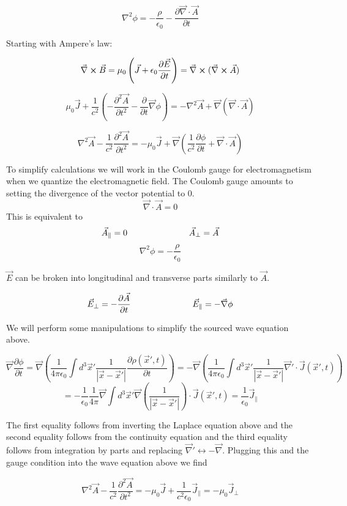 \documentclass[12pt]{article}
\newcommand{\pll}{\parallel}
\newcommand{\pardiv}[2][]{\frac{\partial #1}{\partial #2}}
\newcommand{\vecnab}{\vec{\nabla}}
\begin{document}
\[ \nabla^2 \phi = -\frac{\rho}{\epsilon_0} - \pardiv[\vecnab \cdot \vec{A}]{t} \]

Starting with Ampere's law:

\[ \vecnab \cross \vec{B} = \mu_0 \left(\vec{J} +\epsilon_0 \pardiv[\vec{E}]{t} \right) = \vecnab \cross(\vecnab \cross \vec{A})\]

\[\mu_0 \vec{J} +\frac{1}{c^2}\left(-\pardiv[^2\vec{A}]{t^2} - \pardiv{t} \vecnab \phi \right) = -\nabla^2 \vec{A} +\vecnab(\vecnab\cdot \vec{A})\]

\[ \nabla^2 \vec{A} -\frac{1}{c^2} \pardiv[^2 \vec{A}]{t^2} = -\mu_0 \vec{J} + \vecnab\left(\frac{1}{c^2}\pardiv[\phi]{t}+\vecnab\cdot\vec{A}\right) \]

To simplify calculations we will work in the Coulomb gauge for electromagnetism when we quantize the electromagnetic field.
The Coulomb gauge amounts to setting the divergence of the vector potential to 0.
\[\vecnab \cdot \vec{A} = 0\]
This is equivalent to 
\[ \vec{A}_{\pll} = 0 \hspace{1 in} \vec{A}_{\perp} = \vec{A} \]
\[ \nabla^2 \phi = -\frac{\rho}{\epsilon_0} \]

$\vec{E}$ can be broken into longitudinal and transverse parts similarly to $\vec{A}$.

\[\vec{E}_{\perp} = -\pardiv[\vec{A}]{t} \hspace{1 in} \vec{E}_{\pll} = -\vecnab\phi \]

We will perform some manipulations to simplify the sourced wave equation above.

\[\vecnab \pardiv[\phi]{t} = \vecnab \left(\frac{1}{4\pi \epsilon_0} \int d^3\vec{x}' \frac{1}{|\vec{x}-\vec{x}'|} \pardiv[\rho(\vec{x}',t)]{t} \right) = -\vecnab \left(\frac{1}{4\pi \epsilon_0} \int d^3\vec{x}' \frac{1}{|\vec{x}-\vec{x}'|} \vecnab' \cdot \vec{J}(\vec{x}',t)\right)\]
\[= -\frac{1}{\epsilon_0} \frac{1}{4\pi} \vecnab \int d^3\vec{x}' \vecnab\left(\frac{1}{|\vec{x}-\vec{x}'|} \right) \cdot \vec{J}(\vec{x}',t) = \frac{1}{\epsilon_0} \vec{J}_{\pll} \]

The first equality follows from inverting the Laplace equation above and the second equality follows from the continuity equation and the third equality follows from integration by parts and replacing $\vecnab' \leftrightarrow -\vecnab$.
Plugging this and the gauge condition into the wave equation above we find

\[ \nabla^2 \vec{A} - \frac{1}{c^2} \pardiv[^2\vec{A}]{t^2} = -\mu_0 \vec{J} + \frac{1}{c^2 \epsilon_0} \vec{J}_{\pll} = -\mu_0 \vec{J}_{\perp} \]
\end{document}
